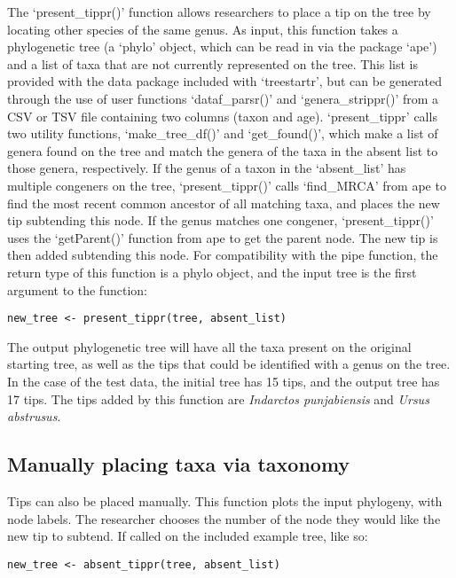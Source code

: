 \documentclass[11pt]{article}
\begin{document}
The `present\_tippr()' function allows researchers to place a tip on the tree by locating other species of the same genus.
As input, this function takes a phylogenetic tree (a `phylo' object, which can be read in via the package `ape') and a list of taxa that are not currently represented on the tree.
This list is provided with the data package included with `treestartr', but can be generated through the use of user functions `dataf\_parsr()' and `genera\_strippr()' from a CSV or TSV file containing two columns (taxon and age).
`present\_tippr' calls two utility functions, `make\_tree\_df()' and `get\_found()', which make a list of genera found on the tree and match the genera of the taxa in the absent list to those genera, respectively.
If the genus of a taxon in the `absent\_list' has multiple congeners on the tree, `present\_tippr()' calls `find\_MRCA' from ape to find the most recent common ancestor of all matching taxa, and places the new tip subtending this node.
If the genus matches one congener, `present\_tippr()' uses the `getParent()' function from ape to get the parent node.
The new tip is then added subtending this node.
For compatibility with the pipe function, the return type of this function is a phylo object, and the input tree is the first argument to the function:

{\tt \begin{snugshade*}
\begin{lstlisting}
new_tree <- present_tippr(tree, absent_list)
\end{lstlisting}
\end{snugshade*}}


The output phylogenetic tree will have all the taxa present on the original starting tree, as well as the tips that could be identified with a genus on the tree.
In the case of the test data, the initial tree has 15 tips, and the output tree has 17 tips.
The tips added by this function are \textit{Indarctos punjabiensis} and \textit{Ursus abstrusus}.

\subsection{Manually placing taxa via taxonomy}

Tips can also be placed manually. 
This function plots the input phylogeny, with node labels. 
The researcher chooses the number of the node they would like the new tip to subtend.
If called on the included example tree, like so:
{\tt \begin{snugshade*}
\begin{lstlisting}
new_tree <- absent_tippr(tree, absent_list)
\end{lstlisting}
\end{snugshade*}}
\end{document}
